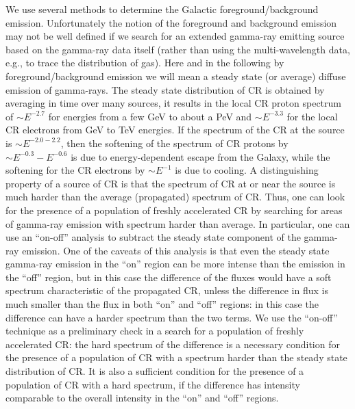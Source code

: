 We use several methods to determine the Galactic foreground/background emission.
Unfortunately the notion of the foreground and background emission may not be well defined if we search for
an extended gamma-ray emitting source based on the gamma-ray data itself
(rather than using the multi-wavelength data, e.g., to trace the distribution of gas).
Here and in the following by foreground/background emission we will mean a steady state 
(or average) diffuse emission of gamma-rays.
The steady state distribution of CR is obtained by averaging in time over many sources, it results in the local CR proton spectrum
of $\sim E^{-2.7}$ for energies from a few GeV to about a PeV and $\sim E^{-3.3}$ for the local CR electrons from GeV to TeV energies.
If the spectrum of the CR at the source is $\sim E^{-2.0 - 2.2}$, then the softening of the spectrum of CR protons by $\sim E^{-0.3} - E^{-0.6}$ 
is due to energy-dependent escape from the Galaxy,
while the softening for the CR electrons by $\sim E^{-1}$ is due to cooling.
A distinguishing property of a source of CR is that the spectrum of CR at or near the source is much harder than the average (propagated)
spectrum of CR.
Thus, one can look for the presence of a population of freshly accelerated CR by searching for areas of gamma-ray emission
with spectrum harder than average. In particular, one can use an ``on-off'' analysis to subtract the steady state component of the gamma-ray emission.
One of the caveats of this analysis is that even the steady state gamma-ray emission in the ``on'' region can be more intense than the emission in the ``off'' region,
but in this case the difference of the fluxes would have a soft spectrum characteristic of the propagated CR,
unless the difference in flux is much smaller than the flux in both ``on'' and  ``off''  regions: in this case the difference can have a harder spectrum than the two terms.
We use the ``on-off'' technique as a preliminary check in a search for a population of freshly accelerated CR:
the hard spectrum of the difference is a necessary condition for the presence of a population of CR with a spectrum harder than the steady state distribution of CR.
It is also a sufficient condition for the presence of a population of CR with a hard spectrum, if the difference
has intensity comparable to the overall intensity in the ``on'' and  ``off''  regions.


